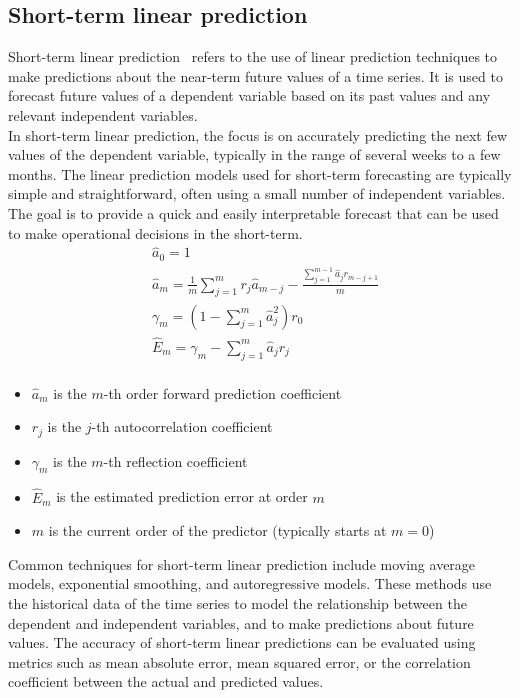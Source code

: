         

    \subsection{Short-term linear prediction} \label{subsec:shortlp}

    Short-term linear prediction~\cite{Riahy} refers to the use of linear prediction techniques to make predictions about the near-term
    future values of a time series.
    It is used to forecast future values of a dependent variable based on its past values and any relevant independent variables.
    \\
    In short-term linear prediction, the focus is on accurately predicting the next few values of the dependent variable, typically in the range of
    several weeks to a few months. The linear prediction models used for short-term forecasting are typically simple and straightforward, often
    using a small number of independent variables. The goal is to provide a quick and easily interpretable forecast that can be used to make operational
    decisions in the short-term.
    \begin{equation} \label{eq:slp}
        \begin{aligned}
            &\hat{a}_0 = 1 \\
            &\hat{a}_m = \frac{1}{m} \sum_{j=1}^{m} r_j \hat{a}_{m-j} - \frac{\sum_{j=1}^{m-1} \hat{a}_j r_{m-j+1}}{m} \\
            &\gamma_m = (1 - \sum_{j=1}^{m} \hat{a}_j^2) r_0 \\
            &\hat{E}_m = \gamma_m - \sum_{j=1}^{m} \hat{a}_j r_{j} \\
        \end{aligned}
    \end{equation}
    \begin{itemize}
        \item $\hat{a}_m$ is the $m$-th order forward prediction coefficient
        \item $r_j$ is the $j$-th autocorrelation coefficient
        \item $\gamma_m$ is the $m$-th reflection coefficient
        \item $\hat{E}_m$ is the estimated prediction error at order $m$
        \item $m$ is the current order of the predictor (typically starts at $m=0$)
    \end{itemize}
    
    Common techniques for short-term linear prediction include moving average models, exponential smoothing, and autoregressive models. These methods
    use the historical data of the time series to model the relationship between the dependent and independent variables, and to make predictions
    about future values. The accuracy of short-term linear predictions can be evaluated using metrics such as mean absolute error, mean squared
    error, or the correlation coefficient between the actual and predicted values.
    
